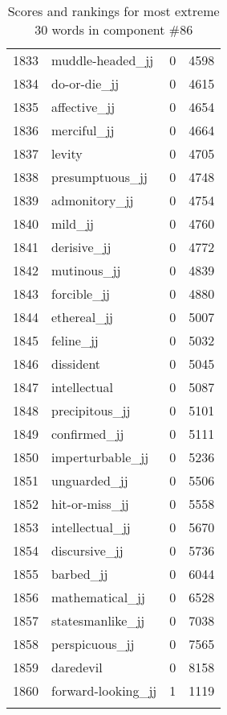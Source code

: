 \begin{longtable}[!htbp]{| rlr@{.}l |}
    1833 & muddle-headed\_jj & 0 & 4598 \\
    1834 & do-or-die\_jj & 0 & 4615 \\
    1835 & affective\_jj & 0 & 4654 \\
    1836 & merciful\_jj & 0 & 4664 \\
    1837 & levity & 0 & 4705 \\
    1838 & presumptuous\_jj & 0 & 4748 \\
    1839 & admonitory\_jj & 0 & 4754 \\
    1840 & mild\_jj & 0 & 4760 \\
    1841 & derisive\_jj & 0 & 4772 \\
    1842 & mutinous\_jj & 0 & 4839 \\
    1843 & forcible\_jj & 0 & 4880 \\
    1844 & ethereal\_jj & 0 & 5007 \\
    1845 & feline\_jj & 0 & 5032 \\
    1846 & dissident & 0 & 5045 \\
    1847 & intellectual & 0 & 5087 \\
    1848 & precipitous\_jj & 0 & 5101 \\
    1849 & confirmed\_jj & 0 & 5111 \\
    1850 & imperturbable\_jj & 0 & 5236 \\
    1851 & unguarded\_jj & 0 & 5506 \\
    1852 & hit-or-miss\_jj & 0 & 5558 \\
    1853 & intellectual\_jj & 0 & 5670 \\
    1854 & discursive\_jj & 0 & 5736 \\
    1855 & barbed\_jj & 0 & 6044 \\
    1856 & mathematical\_jj & 0 & 6528 \\
    1857 & statesmanlike\_jj & 0 & 7038 \\
    1858 & perspicuous\_jj & 0 & 7565 \\
    1859 & daredevil & 0 & 8158 \\
    1860 & forward-looking\_jj & 1 & 1119 \\
    \hline
    \caption{Scores and rankings for most extreme 30 words in component \#86} \\
\end{longtable}
